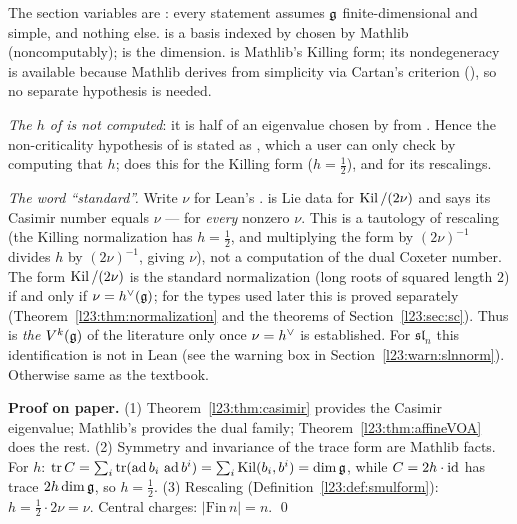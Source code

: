 \begin{dictionary}
The section variables are :
every statement assumes $\mathfrak g$ finite-dimensional and simple, and nothing else.  is a
basis indexed by  chosen by Mathlib (noncomputably);  is the dimension.
 is Mathlib's Killing form; its nondegeneracy 
is available because Mathlib derives  from simplicity via Cartan's criterion
(), so no separate hypothesis is needed.

\emph{The $h$ of  is not computed}: it is half of an eigenvalue chosen by  from
. Hence the non-criticality hypothesis of  is stated as
, which a user can only check by computing that $h$;  does
this for the Killing form ($h=\frac12$), and  for its rescalings.

\emph{The word ``standard''.} Write $\nu$ for Lean's .  is Lie data for $\operatorname{Kil}/(2\nu)$ and
 says its Casimir number equals $\nu$ --- for \emph{every} nonzero $\nu$. This is a tautology of rescaling (the
Killing normalization has $h=\frac12$, and multiplying the form by $(2\nu)^{-1}$ divides $h$ by $(2\nu)^{-1}$, giving $\nu$), not a
computation of the dual Coxeter number. The form $\operatorname{Kil}/(2\nu)$ is the standard normalization (long roots of squared length $2$)
if and only if $\nu=h^\vee(\mathfrak g)$; for the types used later this is proved separately (Theorem~\ref{l23:thm:normalization} and the
 theorems of Section~\ref{l23:sec:sc}). Thus  is \emph{the} $V^k(\mathfrak g)$ of
the literature only once $\nu=h^\vee$ is established. For $\mathfrak{sl}_n$ this identification is not in Lean (see the warning box in Section~\ref{l23:warn:slnnorm}).
Otherwise same as the textbook.
\end{dictionary}

\textbf{Proof on paper.} (1) Theorem~\ref{l23:thm:casimir} provides the Casimir eigenvalue; Mathlib's  provides
the dual family; Theorem~\ref{l23:thm:affineVOA} does the rest. (2) Symmetry and invariance of the trace form are Mathlib
facts. For $h$: $\operatorname{tr}C=\sum_i\operatorname{tr}(\operatorname{ad} b_i\,\operatorname{ad} b^i)=\sum_i\operatorname{Kil}(b_i,b^i)=\dim\mathfrak g$, while
$C=2h\cdot\mathrm{id}$ has trace $2h\dim\mathfrak g$, so $h=\frac12$. (3) Rescaling (Definition~\ref{l23:def:smulform}):
$h=\tfrac12\cdot 2\nu=\nu$. Central charges: $|\mathrm{Fin}\,n|=n$. \qed

